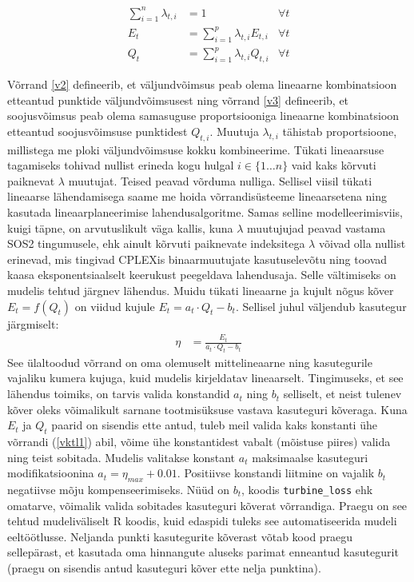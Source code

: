 \documentclass[10pt,a4paper]{article}
\begin{document}
\begin{align}
\sum_{i=1}^n \lambda_{t,i} &= 1 & \forall t \\
E_t &= \sum_{i=1}^p \lambda_{t,i} E_{t, i} & \forall t  \label{v2} \\
Q_t &= \sum_{i=1}^p \lambda_{t,i} Q_{t, i} & \forall t  \label{v3}
\end{align} 

Võrrand \eqref{v2} defineerib, et väljundvõimsus peab olema lineaarne kombinatsioon etteantud punktide väljundvõimsusest ning võrrand \eqref{v3} defineerib, et soojusvõimsus peab olema samasuguse proportsiooniga lineaarne kombinatsioon etteantud soojusvõimsuse punktidest $Q_{t,i}$. Muutuja $\lambda_{t,i}$ tähistab proportsioone, millistega me ploki väljundvõimsuse kokku kombineerime. Tükati lineaarsuse tagamiseks tohivad nullist erineda kogu hulgal $i \in \{1\dots n\}$ vaid kaks kõrvuti paiknevat $\lambda$ muutujat. Teised peavad võrduma nulliga. Sellisel viisil tükati lineaarse lähendamisega saame me hoida võrrandisüsteeme lineaarsetena ning kasutada lineaarplaneerimise lahendusalgoritme.
Samas selline modelleerimisviis, kuigi täpne, on arvutuslikult väga kallis, kuna $\lambda$ muutujujad peavad vastama SOS2 tingumusele, ehk ainult kõrvuti paiknevate indeksitega $\lambda$ võivad olla nullist erinevad, mis tingivad CPLEXis binaarmuutujate kasutuselevõtu ning toovad kaasa eksponentsiaalselt keerukust peegeldava lahendusaja. Selle vältimiseks on mudelis tehtud järgnev lähendus. Muidu tükati lineaarne ja kujult nõgus kõver $E_t = f(Q_t)$ on viidud kujule $E_t = a_t \cdot Q_t - b_t$. Sellisel juhul väljendub kasutegur järgmiselt:
\begin{align}
\eta &= \frac{E_t}{a_t \cdot Q_t - b_t} \label{vktl1}
\end{align}
See ülaltoodud võrrand on oma olemuselt mittelineaarne ning kasutegurile vajaliku kumera kujuga, kuid mudelis kirjeldatav lineaarselt. Tingimuseks, et see lähendus toimiks, on tarvis valida konstandid $a_t$ ning $b_t$ selliselt, et neist tulenev kõver oleks võimalikult sarnane tootmisüksuse vastava kasuteguri kõveraga. Kuna $E_t$ ja $Q_t$ paarid on sisendis ette antud, tuleb meil valida kaks konstanti ühe võrrandi (\ref{vktl1}) abil, võime ühe konstantidest vabalt (mõistuse piires) valida ning teist sobitada. Mudelis valitakse konstant $a_t$ maksimaalse kasuteguri modifikatsioonina $a_t = \eta_{max} + 0.01$. Positiivse konstandi liitmine on vajalik $b_t$ negatiivse mõju kompenseerimiseks.   Nüüd on $b_t$, koodis \texttt{turbine\_loss} ehk omatarve, võimalik valida sobitades kasuteguri kõverat võrrandiga. Praegu on see tehtud mudeliväliselt R koodis, kuid edaspidi tuleks see automatiseerida mudeli eeltöötlusse. Neljanda punkti kasutegurite kõverast võtab kood praegu sellepärast, et kasutada oma hinnangute aluseks parimat enneantud kasutegurit (praegu on sisendis antud kasuteguri kõver ette nelja punktina).
\end{document}
